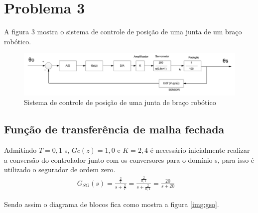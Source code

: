\documentclass[a4paper,12pt]{article}
\begin{document}
\section{Problema 3}
A figura 3 mostra o sistema de controle de posição de uma junta de um braço robótico.
\begin{figure}[H]
	\centering
	\includegraphics[width=0.9\linewidth]{images/planta_problema3}
	\caption{Sistema de controle de posição de uma junta de braço robótico}
	\label{fig:plantaproblema3}
\end{figure}

\subsection{Função de transferência de malha fechada}
Admitindo $T = 0,1$ s, $Gc(z) = 1,0$ e $K=2,4$ é necessário inicialmente realizar a conversão do controlador junto com os conversores para o domínio s, para isso é utilizado o segurador de ordem zero.
	\begin{equation}
		\left.
		\begin{array}{c}
			\displaystyle G_{SO}(s) = \frac{\displaystyle \frac{2}{T}}{s+\displaystyle\frac{2}{T}} = \frac{\displaystyle \frac{2}{0,1}}{s+\displaystyle\frac{2}{0,1}} = \frac{20}{s+20}
		\end{array}
		\right.
		\quad 
	\end{equation}
	
	Sendo assim o diagrama de blocos fica como mostra a figura \ref{img:gso}.
\end{document}
